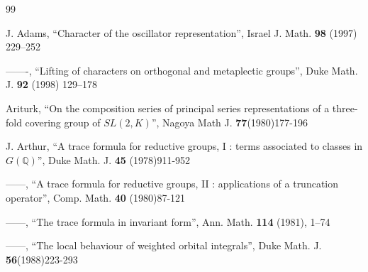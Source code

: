 \documentclass[12pt,letterpaper,openany]{book}
\theoremstyle{plain}
\theoremstyle{definition}
\theoremstyle{remark}
\theoremstyle{remark}
\begin{document}
\begin{thebibliography}{99}

 J. Adams, ``Character of the oscillator representation'',
Israel J. Math. \textbf{98} (1997) 229--252

 -------,
``Lifting of characters on orthogonal and metaplectic groups'',
Duke Math. J. \textbf{92} (1998) 129--178


 Ariturk, ``On the composition series of principal series
representations of a three-fold covering group of $SL(2,K)$'', Nagoya Math
J. \textbf{77}(1980)177-196


 J. Arthur,
``A trace formula for reductive groups, I : terms associated to
classes in $G(\mathbb{Q})$'', Duke Math. J. \textbf{45} (1978)911-952

  ------,
``A trace formula for reductive groups, II : applications of a
truncation operator'', Comp. Math. \textbf{40} (1980)87-121



 ------, ``The trace formula in invariant form'', Ann. Math.
\textbf{114} (1981), 1--74

 ------, ``The local behaviour of weighted orbital integrals'',
Duke Math. J. \textbf{56}(1988)223-293






\end{thebibliography}
\end{document}
